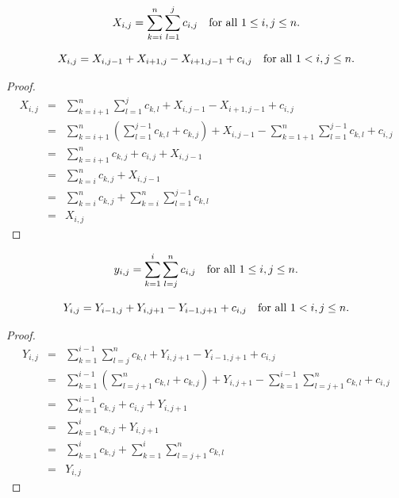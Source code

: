 \documentclass[AMA,LATO1COL]{WileyNJD-v2-bak}
\begin{document}
\begin{definition}
\begin{equation}
X_{i,j}=\sum_{k=i}^{n}\sum_{l=1}^{j}c_{i,j}\mbox{\quad for all $1\leq i,j\leq n$}.
\end{equation}
\end{definition}

\begin{lemma}
\begin{equation}
X_{i,j}=X_{i,j-1}+X_{i+1,j}-X_{i+1,j-1}+c_{i,j} \mbox{\quad for all $1<i,j\leq n$}.
\end{equation}
\end{lemma}

\begin{proof}
\begin{eqnarray*}
X_{i,j}& = & \sum_{k=i+1}^{n}\sum_{l=1}^{j}c_{k,l}+X_{i,j-1}-X_{i+1,j-1}+c_{i,j}\\
 & = & \sum_{k=i+1}^{n}\left(\sum_{l=1}^{j-1}c_{k,l}+c_{k,j}\right)+X_{i,j-1}-\sum_{k=1+1}^{n}\sum_{l=1}^{j-1}c_{k,l}+c_{i,j}\\
 & = & \sum_{k=i+1}^{n}c_{k,j}+c_{i,j}+X_{i,j-1}\\
 & = & \sum_{k=i}^{n}c_{k,j}+X_{i,j-1}\\
 & = & \sum_{k=i}^{n}c_{k,j}+\sum_{k=i}^{n}\sum_{l=1}^{j-1}c_{k,l}\\
 & = & X_{i,j}
\end{eqnarray*}
\end{proof}

\begin{definition}
\begin{equation}
y_{i,j}=\sum_{k=1}^{i}\sum_{l=j}^{n}c_{i,j}\mbox{\quad for all $1\leq i,j\leq n$}.
\end{equation}
\end{definition}

\begin{lemma}
\begin{equation}
Y_{i,j}=Y_{i-1,j}+Y_{i,j+1}-Y_{i-1,j+1}+c_{i,j} \mbox{\quad for all $1<i,j\leq n$}.
\end{equation}
\end{lemma}

\begin{proof}
\begin{eqnarray*}
Y_{i,j}& = & \sum_{k=1}^{i-1}\sum_{l=j}^{n}c_{k,l}+Y_{i,j+1}-Y_{i-1,j+1}+c_{i,j}\\
 & = & \sum_{k=1}^{i-1}\left(\sum_{l=j+1}^{n}c_{k,l}+c_{k,j}\right)+Y_{i,j+1}-\sum_{k=1}^{i-1}\sum_{l=j+1}^{n}c_{k,l}+c_{i,j}\\
 & = & \sum_{k=1}^{i-1}c_{k,j}+c_{i,j}+Y_{i,j+1}\\
 & = & \sum_{k=1}^{i}c_{k,j}+Y_{i,j+1}\\
 & = & \sum_{k=1}^{i}c_{k,j}+\sum_{k=1}^{i}\sum_{l=j+1}^{n}c_{k,l}\\
 & = & Y_{i,j}
\end{eqnarray*}
\end{proof}
\end{document}
